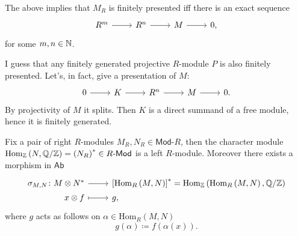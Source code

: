 \begin{rem}[]
	The above implies that $M_R$ is finitely presented iff there is an exact sequence
	\begin{equation*}
	\begin{tikzcd}
		R^m \arrow[r, "", rightarrow] &
		R^n \arrow[r, "", rightarrow] &
		M \arrow[r, "", rightarrow] &
		0
	,\end{tikzcd}
	\end{equation*}
	for some $m,n \in \mathbb{N}$.
\end{rem}

\begin{rem}
	I guess that any finitely generated projective $R$-module $P$ is also finitely presented.
	Let's, in fact, give a presentation of $M$:
	\begin{equation*}
	\begin{tikzcd}
		0 \arrow[r, "", rightarrow] &
		K \arrow[r, "", rightarrow] &
		R^n \arrow[r, "", rightarrow] &
		M \arrow[r, "", rightarrow] &
		0
	.\end{tikzcd}
	\end{equation*}
	By projectivity of $M$ it splits.
	Then $K$ is a direct summand of a free module, hence it is finitely generated.
\end{rem}


\begin{rem}[]
	Fix a pair of right $R$-modules $M_R, N_R \in \mathsf{Mod}\text{-}R$,
	then the character module $\mathrm{Hom}_{\mathbb{Z}}\left( N, \mathbb{Q}/\mathbb{Z} \right) = 
	\left( N_R \right)^* \in R\text{-}\mathsf{Mod}$ is a left $R$-module.
	Moreover there exists a morphism in $\mathsf{Ab}$
	\begin{equation*}
	\begin{tikzcd}[row sep = 0ex
		,/tikz/column 1/.append style={anchor=base east}
		,/tikz/column 2/.append style={anchor=base west}]
		\sigma_{M,N}\colon M \otimes N^* \arrow[r, "", rightarrow] &
		\left[ \mathrm{Hom}_{R}\left( M, N \right) \right]^*
		= \mathrm{Hom}_{\Z}\left( \mathrm{Hom}_{ R}\left( M, N \right), \mathbb{Q}/\Z \right) \\
		x \otimes f \arrow[r, "", mapsto] & g
	,\end{tikzcd}
	\end{equation*}
	where $g$ acts as follows on $\alpha \in \mathrm{Hom}_{R}\left( M, N \right)$
	\begin{equation}
		g(\alpha) \coloneqq f \left( \alpha(x) \right)
	.\end{equation} 
\end{rem}

